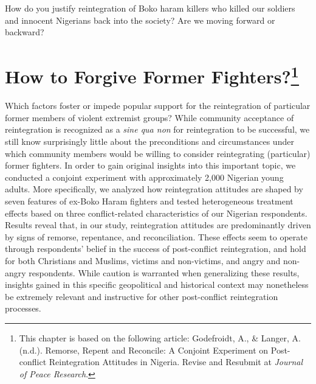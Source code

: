 \begin{savequote}[9cm]
How do you justify reintegration of Boko haram killers who killed our soldiers and innocent Nigerians back into the society? Are we moving forward or backward?
\end{savequote}


\chapter[How to Forgive Former Fighters?]{How to Forgive Former Fighters?\footnote{This chapter is based on the following article: Godefroidt, A., \& Langer, A. (n.d.). Remorse, Repent and Reconcile: A Conjoint Experiment on Post-conflict Reintegration Attitudes in Nigeria. Revise and Resubmit at \textit{Journal of Peace Research}.}}
\label{chap:chap3}


\begin{chapabstract}
Which factors foster or impede popular support for the reintegration of particular former members of violent extremist groups? While community acceptance of reintegration is recognized as a \textit{sine qua non} for reintegration to be successful, we still know surprisingly little about the preconditions and circumstances under which community members would be willing to consider reintegrating (particular) former fighters. In order to gain original insights into this important topic, we conducted a conjoint experiment with approximately 2,000 Nigerian young adults. More specifically, we analyzed how reintegration attitudes are shaped by seven features of ex-Boko Haram fighters and tested heterogeneous treatment effects based on three conflict-related characteristics of our Nigerian respondents. Results reveal that, in our study, reintegration attitudes are predominantly driven by signs of remorse, repentance, and reconciliation. These effects seem to operate through respondents’ belief in the success of post-conflict reintegration, and hold for both Christians and Muslims, victims and non-victims, and angry and non-angry respondents. While caution is warranted when generalizing these results, insights gained in this specific geopolitical and historical context may nonetheless be extremely relevant and instructive for other post-conflict reintegration processes.
\end{chapabstract}
\newpage



